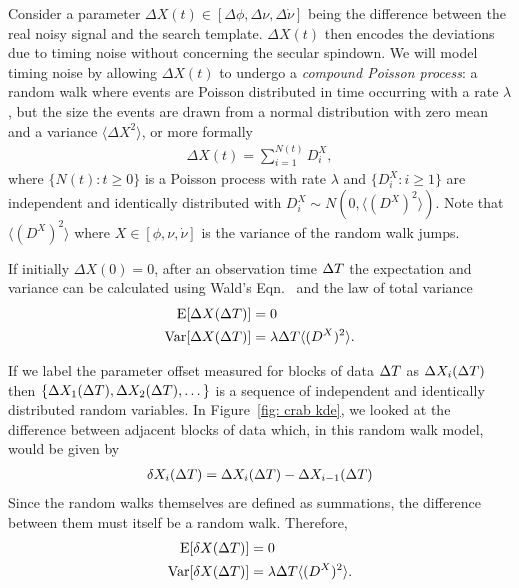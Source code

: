 \documentclass[../full_thesis/full_thesis.tex]{subfiles}
\begin{document}
{Consider a parameter $\Delta X(t) \in [\Delta\phi, \Delta\nu,\Delta\dot{\nu}]$ being
the difference between the real noisy signal and the search template. $\Delta
X(t)$ then encodes the deviations due to timing noise without concerning the
secular spindown.  We will model timing noise by allowing $\Delta X(t)$ to
undergo a \emph{compound Poisson process}: a random walk where events are
Poisson distributed in time occurring with a rate $\lambda$, but the size the
events are drawn from a normal distribution with zero mean and a variance
$\langle \Delta X^{2} \rangle$, or more formally
\begin{align}
\Delta X(t) = \sum_{i=1}^{N(t)} D_i^{X},
\end{align}
where $\{ N(t): t \ge 0\}$ is a Poisson process with rate $\lambda$ and
$\{D_i^X: i \ge 1\}$ are independent and identically distributed with 
$D_i^X \sim N(0, \langle (D^X)^{2}\rangle)$. Note that $\langle (D^X)^{2} \rangle$
where $X \in [\phi, \nu, \dot{\nu}]$ is the variance of the random walk jumps.


If initially $\Delta X(0)=0$, after an observation time $\Delta T$  the
expectation and variance can be calculated using Wald's Eqn.~\citep{wald1944cumulative}
and the law of total variance \citep{weiss2006course}
\begin{align}
\textrm{E}[\Delta X(\Delta T)] & = 0\\
\textrm{Var}[\Delta X(\Delta T)] &  = \lambda \Delta T \langle (D^X)^{2}\rangle.\\
\end{align}

If we label the parameter offset measured for blocks of data $\Delta T$ as  $\Delta
X_{i}(\Delta T)$ then $\{\Delta X_{1}(\Delta T), \Delta X_{2}(\Delta T), \dots\}$ is a
sequence of independent and identically distributed random variables. In
Figure~\ref{fig: crab kde}, we looked at the difference between adjacent
blocks of data which, in this random walk model, would be given by
\begin{align}
\delta X_{i}(\Delta T) =  \Delta X_{i}(\Delta T) - \Delta X_{i-1}(\Delta T)
\end{align}
Since the random walks themselves are defined as summations, the difference
between them must itself be a random walk. Therefore,
\begin{align}
\textrm{E}[\delta X(\Delta T)] & = 0
\label{eqn: Poisson expectation} \\
\textrm{Var}[\delta X(\Delta T)] &  = \lambda \Delta T \langle (D^X)^{2}\rangle.
\label{eqn: Poisson variance}
\end{align}

}
\end{document}
